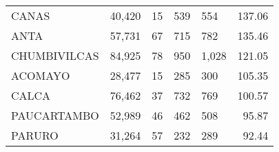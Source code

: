 \begin{tabular}{lrcclr}
	\cellcolor[HTML]{FFFF99}CANAS                                  & 40,420                                                         & 15                                                         & 539                  & 554                                                                 & 137.06                                                                       \\
	\cellcolor[HTML]{FFFF99}ANTA                                   & 57,731                                                         & 67                                                         & 715                  & 782                                                                 & 135.46                                                                       \\
	\cellcolor[HTML]{C6E0B4}CHUMBIVILCAS                           & 84,925                                                         & 78                                                         & 950                  & 1,028                                                               & 121.05                                                                       \\
	\cellcolor[HTML]{C6E0B4}ACOMAYO                                & 28,477                                                         & 15                                                         & 285                  & 300                                                                 & 105.35                                                                       \\
	\cellcolor[HTML]{C6E0B4}CALCA                                  & 76,462                                                         & 37                                                         & 732                  & 769                                                                 & 100.57                                                                       \\
	\cellcolor[HTML]{C6E0B4}PAUCARTAMBO                            & 52,989                                                         & 46                                                         & 462                  & 508                                                                 & 95.87                                                                        \\
	\cellcolor[HTML]{C6E0B4}PARURO                                 & 31,264                                                         & 57                                                         & 232                  & 289                                                                 & 92.44                                                                        \\

\end{tabular}
